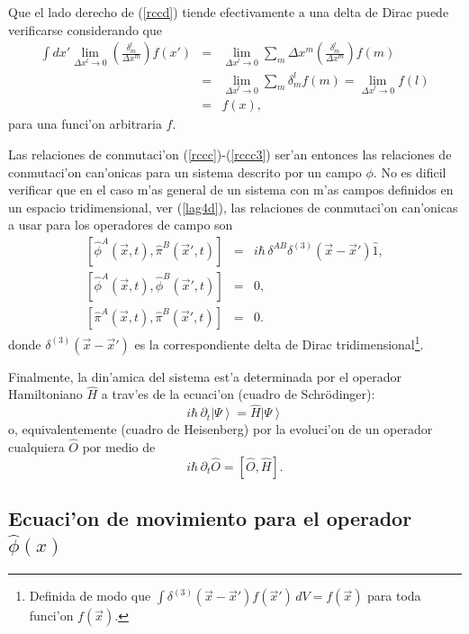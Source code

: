 Que el lado derecho de (\ref{rccd}) tiende efectivamente a una delta de Dirac
puede verificarse considerando que
\begin{eqnarray}
\int dx'\lim_{\Delta x^l \rightarrow 0}\left( \frac{\delta^l_m}{\Delta
x^{m}}\right) f(x')&=& \lim_{\Delta x^l \rightarrow 0}\sum_m \Delta x^m\left(
\frac{\delta^l_m}{\Delta x^{m}}\right) f(m) \nonumber \\
&=&\lim_{\Delta x^l \rightarrow 0}\sum_m \delta^l_m f(m) = \lim_{\Delta x^l
\rightarrow 0} f(l) \nonumber \\
&=& f(x),
\end{eqnarray}
para una funci'on arbitraria $f$.

Las relaciones de conmutaci'on  (\ref{rccc})-(\ref{rccc3}) ser'an entonces las
relaciones de conmutaci'on can'onicas para un sistema descrito por un campo
$\phi$. No es dificil verificar que en el caso m'as general de un sistema con
m'as
campos definidos en un espacio tridimensional, ver (\ref{lag4d}), las relaciones
de conmutaci'on can'onicas a usar para los operadores de campo son
\begin{eqnarray}
\left[ \hat{\phi}^A(\vec{x},t),\hat{\pi}^B(\vec{x}',t)\right] &=&i\hbar\,
\delta^{AB}\delta^{(3)} (\vec{x}-\vec{x}') \hat{1},\label{rccc4d}\\
\left[ \hat{\phi}^A(\vec{x},t),\hat{\phi}^B(\vec{x}',t)\right] &=&0,\\
\left[ \hat{\pi}^A(\vec{x},t),\hat{\pi}^B(\vec{x}',t)\right] &=&0.
\end{eqnarray}
donde $\delta^{(3)} (\vec{x}-\vec{x}') $ es la correspondiente delta de Dirac
tridimensional\footnote{Definida de modo que $\int \delta^{(3)}
(\vec{x}-\vec{x}') f(\vec{x}')\, dV=f(\vec{x})$ para toda funci'on
$f(\vec{x})$.}.

Finalmente, la din'amica del sistema est'a determinada por el operador
Hamiltoniano $\hat H$ a trav'es de la ecuaci'on (cuadro de Schr\"odinger):
\begin{equation}
 i\hbar\, \partial_t\left|\Psi\right>={\hat H}\left|\Psi\right>
\end{equation}
o, equivalentemente (cuadro de Heisenberg) por la evoluci'on de un operador
cualquiera $\hat O$ por medio de
\begin{equation}
i\hbar\, \partial_t{\hat O}=\left[{\hat O},{\hat H}\right].
\end{equation}

\subsection{Ecuaci'on de movimiento para el operador $\hat{\phi}(x)$}

